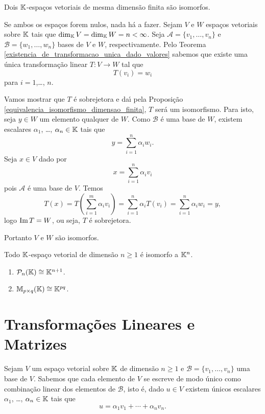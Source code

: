 \begin{teorema}\label{teorema_espacos_isomorfos}
	Dois $\mathbb{K}$-espa\c{c}os vetoriais de mesma dimens\~ao finita s\~ao isomorfos.
\end{teorema}
\begin{prova}
	Se ambos os espa\c{c}os forem nulos, nada h\'a a fazer. Sejam $V$ e $W$ espa\c{c}os vetoriais sobre $\mathbb{K}$ tais que $\dim_{\mathbb{K}}V = \dim_{\mathbb{K}}W = n < \infty$. Seja $\mathcal{A} = \{v_1,\dots,v_n\}$ e $\mathcal{B} = \{w_1,\dots,w_n\}$ bases de $V$ e $W$, respectivamente. Pelo Teorema \ref{existencia_de_transformacao_unica_dado_valores} sabemos que existe uma \'unica transforma\c{c}\~ao linear $T : V \to W$ tal que
	\[
		T(v_i) = w_i
	\]
	para $i=1$,\dots, $n$.

	Vamos mostrar que $T$ \'e sobrejetora e da{\'\i} pela Proposi\c{c}\~ao \ref{equivalencia_isomorfismo_dimensao_finita}, $T$ ser\'a um isomorfismo. Para isto, seja $y \in W$ um elemento qualquer de $W$. Como $\mathcal{B}$ \'e uma base de $W$, existem escalares $\alpha_1$, \dots, $\alpha_n \in \mathbb{K}$ tais que
	\[
		y = \sum_{i=1}^n\alpha_iw_i.
	\]
	Seja $x \in V$ dado por
	\[
		x = \sum_{i=1}^n\alpha_iv_i
	\]
	pois $\mathcal{A}$ \'e uma base de $V$. Temos
	\[
		T(x) = T(\sum_{i=1}^m\alpha_iv_i) = \sum_{i=1}^n\alpha_iT(v_i) = \sum_{i=1}^n\alpha_iw_i = y,
	\]
	logo ${\rm Im\,} T = W$, ou seja, $T$ \'e sobrejetora.

	Portanto $V$ e $W$ s\~ao isomorfos.
\end{prova}

\begin{corolario}
	Todo $\mathbb{K}$-espa\c{c}o vetorial de dimens\~ao $n \ge 1$ \'e isomorfo a $\mathbb{K}^n$.
\end{corolario}

\begin{exemplos}
	\begin{enumerate}
		\item $\mathcal{P}_n(\mathbb{K}) \cong \mathbb{K}^{n+1}$.
		\item $\mathbb{M}_{p\times q}(\mathbb{K}) \cong \mathbb{K}^{pq}$.
	\end{enumerate}
\end{exemplos}

\section{Transforma\c{c}\~oes Lineares e Matrizes} %
\label{sec:transformacoes_lineares_e_matrizes}

Sejam $V$ um espa\c{c}o vetorial sobre $\mathbb{K}$ de dimens\~ao $n \ge 1$ e $\mathcal{B} = \{v_1,\dots,v_n\}$ uma base de $V$. Sabemos que cada elemento de $V$ se escreve de modo \'unico como combina\c{c}\~ao linear dos elementos de $\mathcal{B}$, isto \'e, dado $u \in V$ existem \'unicos escalares $\alpha_1$, \dots, $\alpha_n \in \mathbb{K}$ tais que
\[
	u = \alpha_1v_1 + \cdots + \alpha_nv_n.
\]

